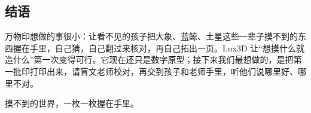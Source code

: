 \documentclass[UTF8,a4paper,zihao=5,fontset=none]{ctexart}
\newcommand\kai{\CJKfamily{kai}}
\begin{document}
\subsection*{结语}
万物印想做的事很小：让看不见的孩子把大象、蓝鲸、土星这些一辈子摸不到的东西握在手里，自己猜，自己翻过来核对，再自己拓出一页。Lux3D 让“想摸什么就造什么”第一次变得可行。它现在还只是数字原型；接下来我们最想做的，是把第一批印打印出来，请盲文老师校对，再交到孩子和老师手里，听他们说哪里好、哪里不对。

\medskip
{\centering\kai\Large\color{stone} 摸不到的世界，一枚一枚握在手里。\par}
\end{document}
